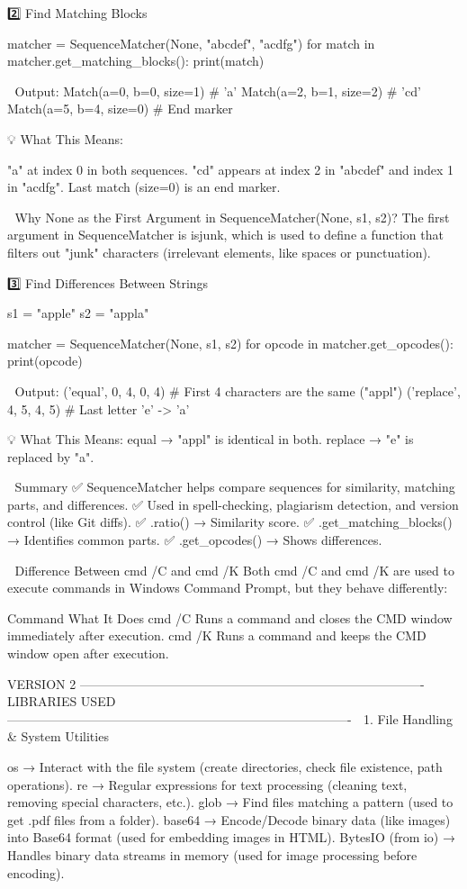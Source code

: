 2️⃣ Find Matching Blocks

matcher = SequenceMatcher(None, "abcdef", "acdfg")
for match in matcher.get_matching_blocks():
    print(match)
    
🔹 Output:
Match(a=0, b=0, size=1)  # 'a'
Match(a=2, b=1, size=2)  # 'cd'
Match(a=5, b=4, size=0)  # End marker

💡 What This Means:

"a" at index 0 in both sequences.
"cd" appears at index 2 in "abcdef" and index 1 in "acdfg".
Last match (size=0) is an end marker.

📌 Why None as the First Argument in SequenceMatcher(None, s1, s2)?
The first argument in SequenceMatcher is isjunk, which is used to define a function that filters out "junk" characters (irrelevant elements, 
like spaces or punctuation).

3️⃣ Find Differences Between Strings

s1 = "apple"
s2 = "appla"

matcher = SequenceMatcher(None, s1, s2)
for opcode in matcher.get_opcodes():
    print(opcode)
    
🔹 Output:
('equal', 0, 4, 0, 4)   # First 4 characters are the same ("appl")
('replace', 4, 5, 4, 5) # Last letter 'e' -> 'a'

💡 What This Means:
equal → "appl" is identical in both.
replace → "e" is replaced by "a".

🎯 Summary
✅ SequenceMatcher helps compare sequences for similarity, matching parts, and differences.
✅ Used in spell-checking, plagiarism detection, and version control (like Git diffs).
✅ .ratio() → Similarity score.
✅ .get_matching_blocks() → Identifies common parts.
✅ .get_opcodes() → Shows differences.

📌 Difference Between cmd /C and cmd /K
Both cmd /C and cmd /K are used to execute commands in Windows Command Prompt, but they behave differently:

Command	What It Does
cmd /C	Runs a command and closes the CMD window immediately after execution.
cmd /K	Runs a command and keeps the CMD window open after execution.

VERSION 2
----------------------------------------------------------------------------------
LIBRARIES USED
----------------------------------------------------------------------------------
📂 1. File Handling & System Utilities

os → Interact with the file system (create directories, check file existence, path operations).
re →	Regular expressions for text processing (cleaning text, removing special characters, etc.).
glob →	Find files matching a pattern (used to get .pdf files from a folder).
base64 →	Encode/Decode binary data (like images) into Base64 format (used for embedding images in HTML).
BytesIO (from io) →	Handles binary data streams in memory (used for image processing before encoding).

